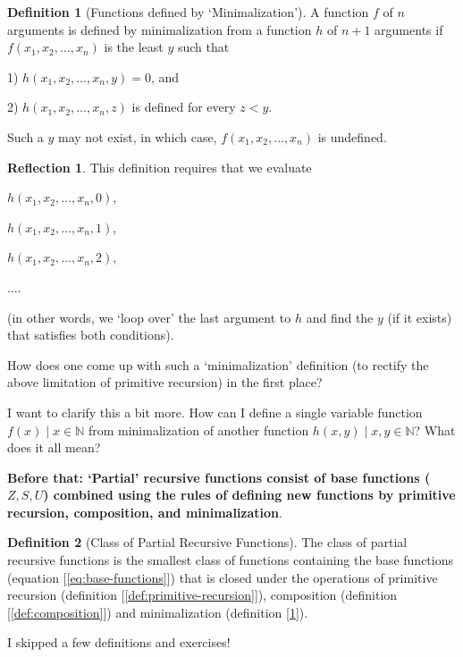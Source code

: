 \documentclass[11pt]{book}
\theoremstyle{definition}
\newtheorem{definition}{Definition}
\theoremstyle{plain}
\theoremstyle{problemstyle}
\theoremstyle{remark}
\theoremstyle{definition}
\newtheorem{reflection}{Reflection}
\begin{document}
\begin{definition}[Functions defined by `Minimalization']
    \label{def:minimalization}
    A function $f$ of $n$ arguments is defined by minimalization from a function $h$ of $n+1$ arguments if $f(x_1,x_2,\dots,x_n)$ is the least $y$ such that

    1) $h(x_1,x_2,\dots,x_n,y)=0$, and

    2) $h(x_1,x_2,\dots,x_n,z)$ is defined for every $z<y$.

    Such a $y$ may not exist, in which case, $f(x_1,x_2,\dots,x_n)$ is undefined. 
\end{definition}

\begin{reflection}
    This definition requires that we evaluate 

    $h(x_1,x_2,\dots,x_n,0)$, 

    $h(x_1,x_2,\dots,x_n,1)$,

    $h(x_1,x_2,\dots,x_n,2)$,

    $\dots$.

    (in other words, we `loop over' the last argument to $h$ and find the $y$ (if it exists) that satisfies both conditions).

    How does one come up with such a `minimalization' definition (to rectify the above limitation of primitive recursion) in the first place?

    I want to clarify this a bit more. How can I define a single variable function $f(x)\mid x\in\mathbb{N}$ from minimalization of another function $h(x,y)\mid x,y\in\mathbb{N}$? What does it all mean?

    \textbf{Before that: `Partial' recursive functions consist of base functions ($Z,S,U$) combined using the rules of defining new functions by primitive recursion, composition, and minimalization}.
\end{reflection}

\begin{definition}[Class of Partial Recursive Functions]
    \label{def:partial-recursive-functions}
    The class of partial recursive functions is the smallest class of functions containing the base functions (equation [\ref{eq:base-functions}]) that is closed under the operations of primitive recursion (definition [\ref{def:primitive-recursion}]), composition (definition [\ref{def:composition}]) and minimalization (definition [\ref{def:minimalization}]).

\end{definition}
I skipped a few definitions and exercises! 
\end{document}

